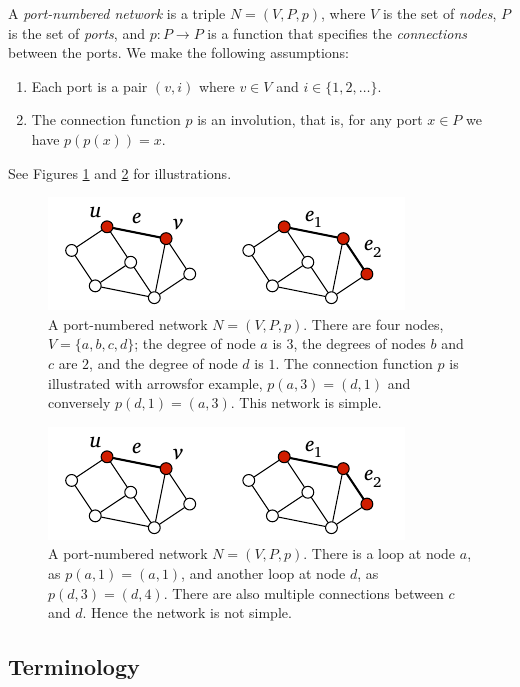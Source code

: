 A \emph{port-numbered network} is a triple $N = (V,P,p)$, where $V$ is the set of \emph{nodes}, $P$ is the set of \emph{ports}, and $p\colon P \to P$ is a function that specifies the \emph{connections} between the ports. We make the following assumptions:
\begin{enumerate}
    \item Each port is a pair $(v,i)$ where $v \in V$ and $i \in \{1,2,\dotsc\}$.
    \item The connection function $p$ is an involution, that is, for any port $x \in P$ we have $p(p(x)) = x$.
\end{enumerate}
See Figures \ref{fig:pnna} and \ref{fig:pnnb} for illustrations.
\begin{figure}
    \centering
    \includegraphics[page=\PPnnA]{figs.pdf}
    \caption{A port-numbered network $N = (V,P,p)$. There are four nodes, $V = \{a,b,c,d\}$; the degree of node $a$ is $3$, the degrees of nodes $b$ and $c$ are $2$, and the degree of node $d$ is $1$. The connection function $p$ is illustrated with arrows\mydash for example, $p(a,3) = (d,1)$ and conversely $p(d,1) = (a,3)$. This network is simple.}\label{fig:pnna}
\end{figure}
\begin{figure}
    \centering
    \includegraphics[page=\PPnnB]{figs.pdf}
    \caption{A port-numbered network $N = (V,P,p)$. There is a loop at node $a$, as $p(a,1) = (a,1)$, and another loop at node $d$, as $p(d,3) = (d,4)$. There are also multiple connections between $c$ and $d$. Hence the network is not simple.}\label{fig:pnnb}
\end{figure}

\subsection{Terminology}

